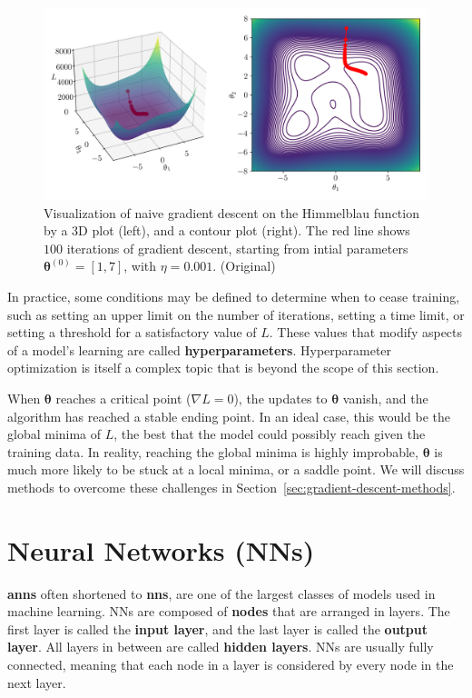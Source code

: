 \documentclass[12pt]{report}
\theoremstyle{definition}
\theoremstyle{remark}
\begin{document}
\begin{figure}[h]
    \centering
    \includegraphics[width=\linewidth]{figs/gradient_descent.png}
    \caption{Visualization of naive gradient descent on the Himmelblau function \cite{jamil_literature_2013} by a 3D plot (left), and a contour plot (right). The red line shows $100$ iterations of gradient descent, starting from intial parameters $\boldsymbol{\theta}^{(0)} = [1,7]$, with $\eta = 0.001$. (Original)}
    \label{fig:enter-label}
\end{figure}

In practice, some conditions may be defined to determine when to cease training, such as setting an upper limit on the number of iterations, setting a time limit, or setting a threshold for a satisfactory value of $L$. These values that modify aspects of a model's learning are called \textbf{\glspl{hyperparameter}}. Hyperparameter optimization is itself a complex topic that is beyond the scope of this section.

When $\boldsymbol{\theta}$ reaches a critical point ($\nabla L = 0$), the updates to $\boldsymbol{\theta}$ vanish, and the algorithm has reached a stable ending point. In an ideal case, this would be the global minima of $L$, the best that the model could possibly reach given the training data. In reality, reaching the global minima is highly improbable, $\boldsymbol{\theta}$ is much more likely to be stuck at a local minima, or a saddle point. We will discuss methods to overcome these challenges in Section~\ref{sec:gradient-descent-methods}.

\section{Neural Networks (NNs)}\label{sec:nn}

\textbf{\Glspl{ann}} often shortened to \textbf{\glspl{nn}}, are one of the largest classes of models used in machine learning. NNs are composed of \textbf{\glspl{node}} that are arranged in layers. The first layer is called the \textbf{input layer}, and the last layer is called the \textbf{output layer}. All layers in between are called \textbf{hidden layers}. NNs are usually fully connected, meaning that each node in a layer is considered by every node in the next layer.
\end{document}
